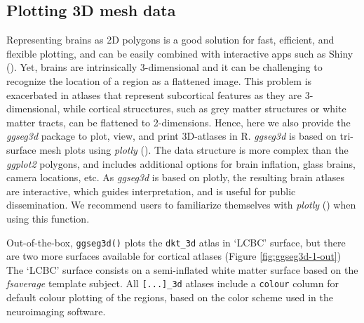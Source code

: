 \documentclass[fleqn,10pt]{wlpeerj} %
\begin{document}
\hypertarget{plotting-3d-mesh-data}{%
\subsection{Plotting 3D mesh data}\label{plotting-3d-mesh-data}}

Representing brains as 2D polygons is a good solution for fast, efficient, and flexible plotting, and can be easily combined with interactive apps such as Shiny (\citet{shiny}).
Yet, brains are intrinsically 3-dimensional and it can be challenging to recognize the location of a region as a flattened image.
This problem is exacerbated in atlases that represent subcortical features as they are 3-dimensional, while cortical strucctures, such as grey matter structures or white matter tracts, can be flattened to 2-dimensions.
Hence, here we also provide the \emph{ggseg3d} package to plot, view, and print 3D-atlases in R.
\emph{ggseg3d} is based on tri-surface mesh plots using \emph{plotly} (\citet{plotly}).
The data structure is more complex than the \emph{ggplot2} polygons, and includes additional options for brain inflation, glass brains, camera locations, etc.
As \emph{ggseg3d} is based on plotly, the resulting brain atlases are interactive, which guides interpretation, and is useful for public dissemination.
We recommend users to familiarize themselves with \emph{plotly} (\citet{plotly}) when using this function.

Out-of-the-box, \texttt{ggseg3d()} plots the \texttt{dkt\_3d} atlas in `LCBC' surface, but there are two more surfaces available for cortical atlases (Figure \ref{fig:ggseg3d-1-out})
The `LCBC' surface consists on a semi-inflated white matter surface based on the \emph{fsaverage} template subject.
All \texttt{{[}...{]}\_3d} atlases include a \texttt{colour} column for default colour plotting of the regions, based on the color scheme used in the neuroimaging software.
\end{document}
